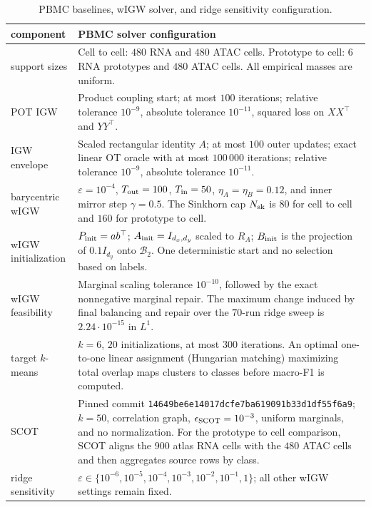 \documentclass[11pt]{article}
\theoremstyle{plain}
\theoremstyle{definition}
\theoremstyle{remark}
\begin{document}
\begin{table}[H]
\centering
\footnotesize
\begin{tabularx}{\textwidth}{@{}>{\raggedright\arraybackslash}p{}X@{}}
\toprule
component & PBMC solver configuration\\
\midrule
support sizes &
Cell to cell: \(480\) RNA and \(480\) ATAC cells. Prototype to cell:
\(6\) RNA prototypes and \(480\) ATAC cells. All empirical masses are uniform.\\
POT IGW &
Product coupling start; at most \(100\) iterations; relative tolerance
\(10^{-9}\), absolute tolerance \(10^{-11}\), squared loss on \(XX^\top\)
and \(YY^\top\).\\
IGW envelope &
Scaled rectangular identity \(A\); at most \(100\) outer updates; exact
linear OT oracle with at most \(100\,000\) iterations; relative tolerance
\(10^{-9}\), absolute tolerance \(10^{-11}\).\\
barycentric wIGW &
\(\varepsilon=10^{-4}\), \(T_{\rm out}=100\), \(T_{\rm in}=50\),
\(\eta_A=\eta_B=0.12\), and inner mirror step \(\gamma=0.5\).
The Sinkhorn cap \(N_{\rm sk}\) is \(80\) for cell to cell and \(160\) for
prototype to cell.\\
wIGW initialization &
\(P_{\rm init}=ab^\top\); \(A_{\rm init}=I_{d_x,d_y}\) scaled to \(R_A\);
\(B_{\rm init}\) is the projection of \(0.1I_{d_y}\) onto
\(\mathcal B_2\). One deterministic start and no selection based on labels.\\
wIGW feasibility &
Marginal scaling tolerance \(10^{-10}\), followed by the exact nonnegative
marginal repair. The maximum change induced by final balancing and repair over the
\(70\)-run ridge sweep is
\(2.24\cdot10^{-15}\) in \(L^1\).\\
target \(k\)-means &
\(k=6\), \(20\) initializations, at most \(300\) iterations. An optimal
one-to-one linear assignment (Hungarian matching) maximizing total overlap maps
clusters to classes before macro-F1 is computed.\\
SCOT &
Pinned commit \texttt{14649be6e14017dcfe7ba619091b33d1df55f6a9};
\(k=50\), correlation graph, \(\epsilon_{\rm SCOT}=10^{-3}\), uniform
marginals, and no normalization. For the prototype to cell comparison, SCOT aligns
the \(900\) atlas RNA cells with the \(480\) ATAC cells and then aggregates
source rows by class.\\
ridge sensitivity &
\(\varepsilon\in\{10^{-6},10^{-5},10^{-4},10^{-3},10^{-2},10^{-1},1\}\);
all other wIGW settings remain fixed.\\
\bottomrule
\end{tabularx}
\caption{PBMC baselines, wIGW solver, and ridge sensitivity configuration.}
\label{tab:pbmc-solver-config}
\end{table}
\end{document}
